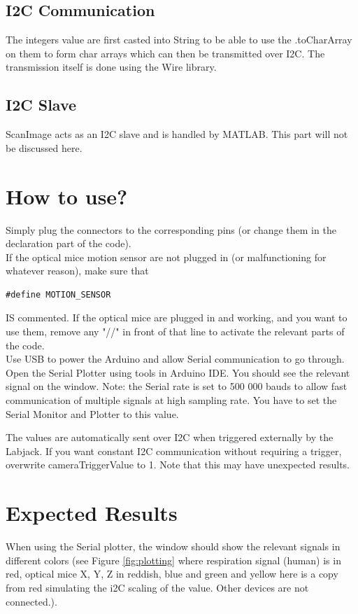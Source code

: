\documentclass[a4paper]{article}
\begin{document}
\subsection{I2C Communication}
The integers value are first casted into String to be able to use the .toCharArray on them to form char arrays which can then be transmitted over I2C.
The transmission itself is done using the Wire library.

\subsection{I2C Slave}
ScanImage acts as an I2C slave and is handled by MATLAB. This part will not be discussed here.

\section{How to use?}
Simply plug the connectors to the corresponding pins (or change them in the declaration part of the code).\\

If the optical mice motion sensor are not plugged in (or malfunctioning for whatever reason), make sure that 
\begin{lstlisting}
#define MOTION_SENSOR
\end{lstlisting}
IS commented. 
If the optical mice are plugged in and working, and you want to use them, remove any "//" in front of that line to activate the relevant parts of the code. \\

Use USB to power the Arduino and allow Serial communication to go through. Open the Serial Plotter using tools in Arduino IDE. You should see the relevant signal on the window.
Note: the Serial rate is set to 500 000 bauds to allow fast communication of multiple signals at high sampling rate. You have to set the Serial Monitor and Plotter to this value.

The values are automatically sent over I2C when triggered externally by the Labjack. If you want constant I2C communication without requiring a trigger, overwrite cameraTriggerValue to 1. Note that this may have unexpected results. 

\section{Expected Results}
When using the Serial plotter, the window should show the relevant signals in different colors (see Figure \ref{fig:plotting} where respiration signal (human) is in red, optical mice X, Y, Z in reddish, blue and green and yellow here is a copy from red simulating the i2C scaling of the value.
Other devices are not connected.).
\end{document}
